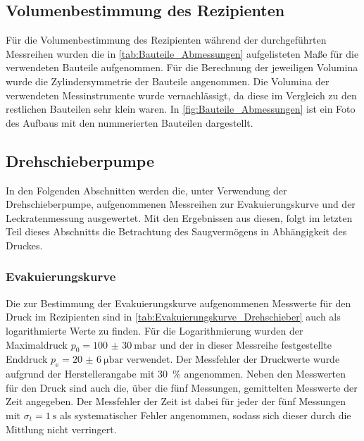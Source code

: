 
\subsection{Volumenbestimmung des Rezipienten}
Für die Volumenbestimmung des Rezipienten während der durchgeführten Messreihen wurden die in 
\cref{tab:Bauteile_Abmessungen} aufgelisteten Maße für die verwendeten Bauteile aufgenommen.
Für die Berechnung der jeweiligen Volumina wurde die Zylindersymmetrie der 
Bauteile angenommen. Die Volumina der verwendeten Messinstrumente wurde 
vernachlässigt, da diese im Vergleich zu den restlichen Bauteilen sehr klein 
waren. In \cref{fig:Bauteile_Abmessungen} ist ein Foto des Aufbaus mit den nummerierten Bauteilen dargestellt.  






\subsection{Drehschieberpumpe}
In den Folgenden Abschnitten werden die, unter Verwendung der Drehschieberpumpe, aufgenommenen Messreihen 
zur Evakuierungskurve und der Leckratenmessung ausgewertet. Mit den Ergebnissen aus diesen, folgt im letzten Teil dieses 
Abschnitts die Betrachtung des Saugvermögens in Abhängigkeit des Druckes.

\subsubsection{Evakuierungskurve}
Die zur Bestimmung der Evakuierungskurve aufgenommenen Messwerte für den Druck
im Rezipienten sind in \cref{tab:Evakuierungskurve_Drehschieber} auch als logarithmierte
Werte zu finden. Für die Logarithmierung wurden der Maximaldruck $p_{0} =\SI{100(30)}{\milli\bar} $
und der in dieser Messreihe festgestellte Enddruck $p_{\mathrm{e}} =\SI{20(6)}{\micro\bar}$ verwendet.
Der Messfehler der Druckwerte wurde aufgrund der Herstellerangabe \cite{DatenblattV70} mit \SI{30}{\percent} angenommen.
Neben den Messwerten für den Druck sind auch die, über die fünf Messungen, gemittelten Messwerte der Zeit 
angegeben. Der Messfehler der Zeit ist dabei für jeder der fünf Messungen mit $\sigma_{t} = \SI{1}{\s}$ als systematischer
Fehler angenommen, sodass sich dieser durch die Mittlung nicht verringert.                  



